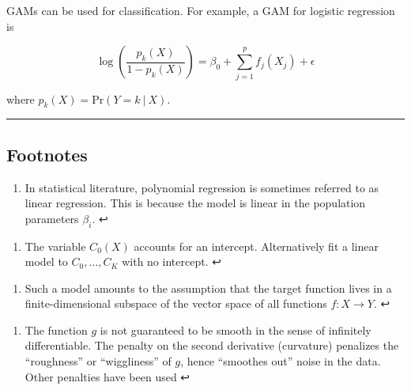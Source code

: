 \documentclass[11pt]{article}
\providecommand{\tightlist}{%
      \setlength{\itemsep}{0pt}\setlength{\parskip}{0pt}}
\begin{document}
    GAMs can be used for classification. For example, a GAM for logistic
regression is

\[\log\left(\frac{p_k(X)}{1 - p_k(X)}\right) =\beta_0 + \sum_{j=1}^p f_j(X_j) + \epsilon\]

where \(p_k(X) =\text{Pr}(Y = k\ |\ X)\).

    \begin{center}\rule{0.5\linewidth}{\linethickness}\end{center}

\hypertarget{footnotes}{%
\subsection{Footnotes}\label{footnotes}}

    \hypertarget{foot54}{}
\begin{enumerate}
\def\labelenumi{\arabic{enumi}.}
\setcounter{enumi}{53}
\tightlist
\item
  In statistical literature, polynomial regression is sometimes referred
  to as linear regression. This is because the model is linear in the
  population parameters \(\beta_i\). ↩
\end{enumerate}

\hypertarget{foot55}{}
\begin{enumerate}
\def\labelenumi{\arabic{enumi}.}
\setcounter{enumi}{54}
\tightlist
\item
  The variable \(C_0(X)\) accounts for an intercept. Alternatively fit a
  linear model to \(C_0, \dots, C_K\) with no intercept. ↩
\end{enumerate}

\hypertarget{foot56}{}
\begin{enumerate}
\def\labelenumi{\arabic{enumi}.}
\setcounter{enumi}{55}
\tightlist
\item
  Such a model amounts to the assumption that the target function lives
  in a finite-dimensional subspace of the vector space of all functions
  \(f:X\rightarrow Y\). ↩
\end{enumerate}

\hypertarget{foot57}{}
\begin{enumerate}
\def\labelenumi{\arabic{enumi}.}
\setcounter{enumi}{56}
\tightlist
\item
  The function \(g\) is not guaranteed to be smooth in the sense of
  infinitely differentiable. The penalty on the second derivative
  (curvature) penalizes the ``roughness'' or ``wiggliness'' of \(g\),
  hence ``smoothes out'' noise in the data. Other penalties have been
  used ↩
\end{enumerate}
\end{document}
